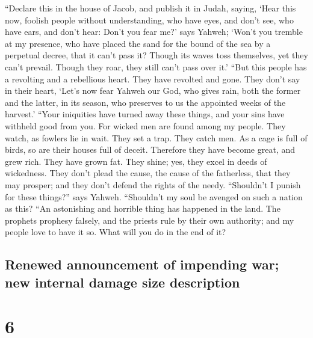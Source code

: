  ``Declare this in the house of Jacob, and publish it in
Judah, saying,  `Hear this now, foolish people without
understanding, who have eyes, and don't see, who have ears, and don't
hear:  Don't you fear me?' says Yahweh; `Won't you
tremble at my presence, who have placed the sand for the bound of the
sea by a perpetual decree, that it can't pass it? Though its waves toss
themselves, yet they can't prevail. Though they roar, they still can't
pass over it.'  ``But this people has a revolting and a
rebellious heart. They have revolted and gone.  They
don't say in their heart, `Let's now fear Yahweh our God, who gives
rain, both the former and the latter, in its season, who preserves to us
the appointed weeks of the harvest.'  ``Your iniquities
have turned away these things, and your sins have withheld good from
you.  For wicked men are found among my people. They
watch, as fowlers lie in wait. They set a trap. They catch men.
 As a cage is full of birds, so are their houses full of
deceit. Therefore they have become great, and grew rich. 
They have grown fat. They shine; yes, they excel in deeds of wickedness.
They don't plead the cause, the cause of the fatherless, that they may
prosper; and they don't defend the rights of the needy. 
``Shouldn't I punish for these things?'' says Yahweh. ``Shouldn't my
soul be avenged on such a nation as this?  ``An
astonishing and horrible thing has happened in the land. 
The prophets prophesy falsely, and the priests rule by their own
authority; and my people love to have it so. What will you do in the end
of it?

\hypertarget{renewed-announcement-of-impending-war-new-internal-damage-size-description}{%
\subsection{Renewed announcement of impending war; new internal damage
size
description}\label{renewed-announcement-of-impending-war-new-internal-damage-size-description}}

\hypertarget{section-5}{%
\section{6}\label{section-5}}

